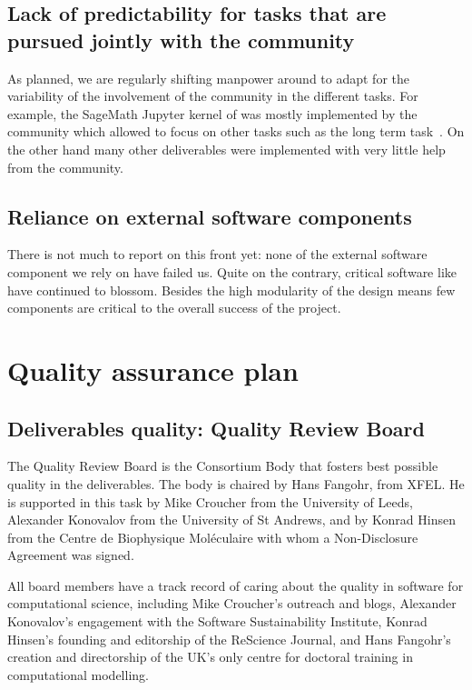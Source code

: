 \documentclass{deliverablereport}
\begin{document}
\subsection{Lack of predictability for tasks that are pursued jointly
  with the community}

As planned, we are regularly shifting manpower around to adapt for the
variability of the involvement of the community in the different
tasks. For example, the SageMath Jupyter kernel of
 was mostly implemented by the
community which allowed to focus on other tasks such as the long term
task~.  On
the other hand many other deliverables were implemented with very
little help from the community.

\subsection{Reliance on external software components}

There is not much to report on this front yet: none of the external
software component we rely on have failed us. Quite on the contrary,
critical software like \Jupyter have continued to blossom. Besides the
high modularity of the design means few components are critical to the
overall success of the project.

\section{Quality assurance plan}

\subsection{Deliverables quality: Quality Review Board}


The Quality Review Board is the Consortium Body that fosters best
possible quality in the deliverables. The body is chaired by Hans
Fangohr, from XFEL. He is supported in this
task by Mike Croucher from the University of Leeds, Alexander
Konovalov from the University of St Andrews, and by Konrad Hinsen from
the Centre de Biophysique Moléculaire with whom a Non-Disclosure Agreement
was signed.

All board members have a track record of caring about the quality in
software for computational science, including Mike Croucher's outreach
and blogs, Alexander Konovalov's engagement with the Software
Sustainability Institute, Konrad Hinsen's founding and editorship of
the ReScience Journal, and Hans Fangohr's creation and directorship of
the UK's only centre for doctoral training in computational modelling.
\end{document}

